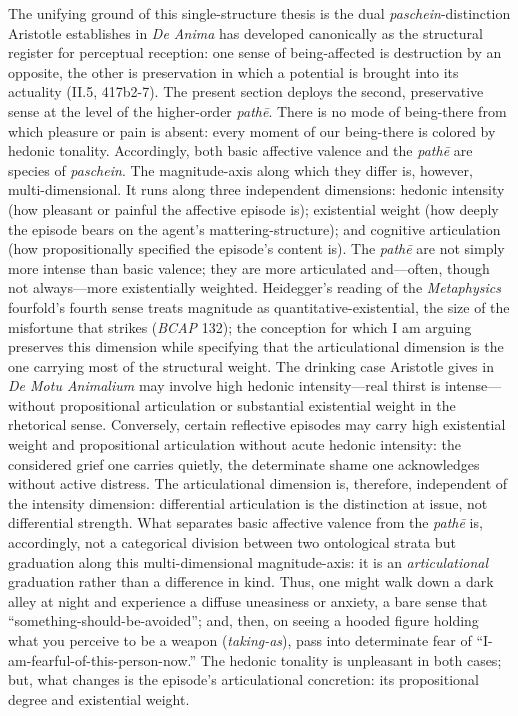 The unifying ground of this single-structure thesis is the dual \textit{paschein}-distinction Aristotle establishes in \textit{De Anima} has developed canonically as the structural register for perceptual reception: one sense of being-affected is destruction by an opposite, the other is preservation in which a potential is brought into its actuality (II.5, 417b2-7). The present section deploys the second, preservative sense at the level of the higher-order \textit{pathē}. There is no mode of being-there from which pleasure or pain is absent: every moment of our being-there is colored by hedonic tonality. Accordingly, both basic affective valence and the \textit{pathē} are species of \textit{paschein}. The magnitude-axis along which they differ is, however, multi-dimensional. It runs along three independent dimensions: hedonic intensity (how pleasant or painful the affective episode is); existential weight (how deeply the episode bears on the agent's mattering-structure); and cognitive articulation (how propositionally specified the episode's content is). The \textit{pathē} are not simply more intense than basic valence; they are more articulated and---often, though not always---more existentially weighted. Heidegger's reading of the \textit{Metaphysics} fourfold's fourth sense treats magnitude as quantitative-existential, the size of the misfortune that strikes (\textit{BCAP} 132); the conception for which I am arguing preserves this dimension while specifying that the articulational dimension is the one carrying most of the structural weight. The drinking case Aristotle gives in \textit{De Motu Animalium} may involve high hedonic intensity---real thirst is intense---without propositional articulation or substantial existential weight in the rhetorical sense. Conversely, certain reflective episodes may carry high existential weight and propositional articulation without acute hedonic intensity: the considered grief one carries quietly, the determinate shame one acknowledges without active distress. The articulational dimension is, therefore, independent of the intensity dimension: differential articulation is the distinction at issue, not differential strength. What separates basic affective valence from the \textit{pathē} is, accordingly, not a categorical division between two ontological strata but graduation along this multi-dimensional magnitude-axis: it is an \textit{articulational} graduation rather than a difference in kind. Thus, one might walk down a dark alley at night and experience a diffuse uneasiness or anxiety, a bare sense that ``something-should-be-avoided''; and, then, on seeing a hooded figure holding what you perceive to be a weapon (\textit{taking-as}), pass into determinate fear of ``I-am-fearful-of-this-person-now.'' The hedonic tonality is unpleasant in both cases; but, what changes is the episode's articulational concretion: its propositional degree and existential weight. 

